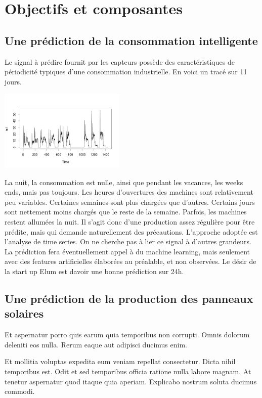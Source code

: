 \documentclass[a4paper]{article}
\begin{document}
\section{Objectifs et composantes}
\begin{multicols}{2}
\subsection{Une prédiction de la consommation intelligente}
Le signal à prédire fournit par les capteurs possède des caractéristiques de périodicité typiques d'une consommation industrielle. En voici un tracé sur 11 jours.

\includegraphics[width=0.45\textwidth]{./images/traceconsom.png}

La nuit, la consommation est nulle, ainsi que pendant les vacances, les weeks ends, mais pas toujours. Les heures d'ouvertures des machines sont relativement peu variables. Certaines semaines sont plus chargées que d'autres. Certains jours sont nettement moins chargés que le reste de la semaine. Parfois, les machines restent allumées la nuit. Il s'agit donc d'une production assez régulière pour être prédite, mais qui demande naturellement des précautions.
L'approche adoptée est l'analyse de time series. On ne cherche pas à lier ce signal à d'autres grandeurs. La prédiction fera éventuellement appel à du machine learning, mais seulement avec des features artificielles élaborées au préalable, et non observées.
Le désir de la start up Elum est davoir une bonne prédiction sur 24h.

\subsection{Une prédiction de la production des panneaux solaires}


Et aspernatur porro quis earum quia temporibus non corrupti. Omnis dolorum
    deleniti eos nulla. Rerum eaque aut adipisci ducimus enim.

Et mollitia voluptas expedita eum veniam repellat consectetur. Dicta nihil
    temporibus est. Odit et sed temporibus officia ratione nulla labore magnam.
    At tenetur aspernatur quod itaque quia aperiam. Explicabo nostrum soluta
    ducimus commodi.


\end{multicols}
\end{document}
